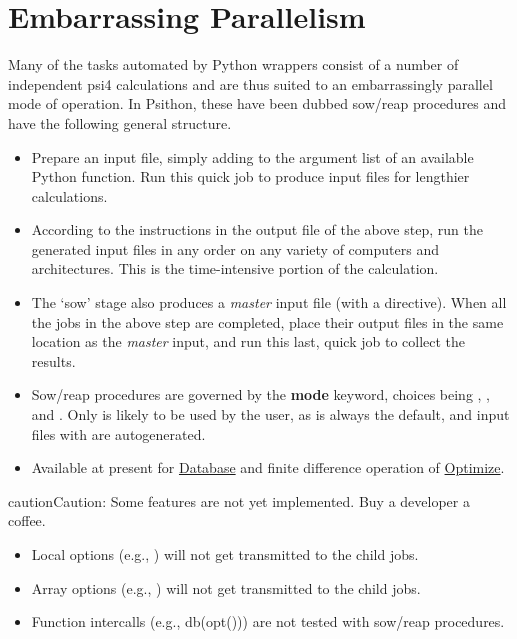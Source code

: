 \documentclass[letterpaper,10pt,english]{sphinxmanual}
\begin{document}
\chapter{Embarrassing Parallelism}
\label{index:embarrassing-parallelism}
Many of the tasks automated by Python wrappers consist of a number of
independent psi4 calculations and are thus suited to an embarrassingly
parallel mode of operation. In Psithon, these have been dubbed sow/reap
procedures and have the following general structure.
\begin{itemize}
\item {} 
Prepare an input file, simply adding  to the
argument list of an available Python function. Run this quick job to
produce input files for lengthier calculations.

\item {} 
According to the instructions in the output file of the above step,
run the generated input files in any order on any variety of computers
and architectures. This is the time-intensive portion of the
calculation.

\item {} 
The `sow' stage also produces a \emph{master} input file (with a
 directive). When all the jobs in the above step are
completed, place their output files in the same location as the
\emph{master} input, and run this last, quick job to collect the results.

\end{itemize}
\begin{itemize}
\item {} 
Sow/reap procedures are governed by the \textbf{mode} keyword, choices being
, , and . Only  is likely to
be used by the user, as  is always the default, and
input files with  are autogenerated.

\item {} 
Available at present for {\hyperref[index:database]{Database}} and finite difference operation of {\hyperref[index:optimize]{Optimize}}.

\end{itemize}

\begin{notice}{caution}{Caution:}
Some features are not yet implemented. Buy a developer a coffee.
\begin{itemize}
\item {} 
Local options (e.g., ) will not get transmitted to the child jobs.

\item {} 
Array options (e.g., ) will not get transmitted to the child jobs.

\item {} 
Function intercalls (e.g., db(opt())) are not tested with sow/reap procedures.

\end{itemize}
\end{notice}
\end{document}
